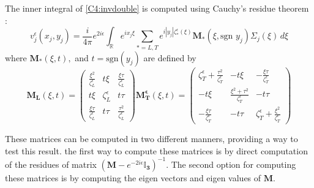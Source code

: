 The inner integral of \eqref{C4:invdouble} is computed using Cauchy's residue theorem :
\begin{equation}
v_j^{\epsilon}(x_j,y_j)=\frac{i}{4\pi}e^{2i\epsilon}\int_{\mathbb{R}} e^{ix_j\xi}\sum_{*=L,T}e^{i|y_j|\zeta_*^{\epsilon}(\xi)}\mathbf{M_*}(\xi,\mbox{sgn }y_j)\Sigma_j(\xi)\,d\xi
\label{C4:vjeps}
\end{equation}
where $\mathbf{M_*}(\xi,t),$ and $t=\mbox{sgn}( y_j)$ are defined by
\begin{subequations}
\begin{equation}
\mathbf{M_L}(\xi,t)=\begin{pmatrix}
\frac{\xi^2}{\zeta_L^{\epsilon}} &t\xi & \frac{\xi\tau}{\zeta_L^{\epsilon}} \\
t\xi & \zeta_L^{\epsilon} & t\tau \\
\frac{\xi\tau}{\zeta_L^{\epsilon}}& t\tau & \frac{\tau^2}{\zeta_L^{\epsilon}}
\end{pmatrix}
\label{C4:MLeps}
\end{equation}
\begin{equation}
\mathbf{M_T^{\epsilon}}(\xi,t)=\begin{pmatrix}
\zeta_T^{\epsilon} +\frac{\tau^2}{\zeta_T^{\epsilon}}& -t\xi &-\frac{\xi\tau}{\zeta_T^{\epsilon}}\\
-t\xi & \frac{\xi^2+\tau^2}{\zeta_T^{\epsilon}}&-t\tau \\
-\frac{\xi\tau}{\zeta_T^{\epsilon}}&-t\tau&\zeta_T^{\epsilon} +\frac{\xi^2}{\zeta_T^{\epsilon}}
\end{pmatrix}
\label{C4:MTeps}
\end{equation}
\label{C4:M*eps}
\end{subequations}

These matrices can be computed in two different manners, providing a way to test this result. the first way to compute these matrices is by direct computation of the residues of matrix $(\mathbf{M}-e^{-2i\epsilon}\mathbf{\mathbb{I}_3})^{-1}$. The second option for computing these matrices is by computing the eigen vectors and eigen values of $\mathbf{M}$. %

